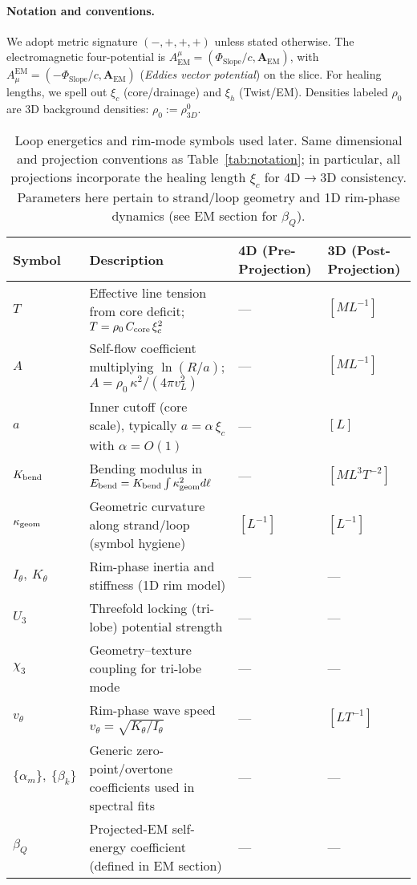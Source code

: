 \paragraph{Notation and conventions.}
We adopt metric signature $(-,+,+,+)$ unless stated otherwise. The electromagnetic four-potential is $A^\mu_{\text{EM}}=(\Phi_{\text{Slope}}/c,\mathbf A_{\text{EM}})$, with $A_{\mu}^{\text{EM}} = (-\Phi_{\text{Slope}}/c,\mathbf A_{\text{EM}})$ (\emph{Eddies vector potential}) on the slice. For healing lengths, we spell out $\xi_c$ (core/drainage) and $\xi_h$ (Twist/EM). Densities labeled $\rho_0$ are 3D background densities: $\rho_0 := \rho_{3D}^0$.

\begin{table}[H]
\centering
\begingroup
\small
\begin{tabularx}{\textwidth}{|l|Y|l|l|}
\hline
Symbol & Description & 4D (Pre-Projection) & 3D (Post-Projection) \\
\hline
$T$ & Effective line tension from core deficit; $T=\rho_0\,C_{\rm core}\,\xi_c^2$ & --- & $[M L^{-1}]$ \\
\hline
$A$ & Self-flow coefficient multiplying $\ln(R/a)$; $A=\rho_0\,\kappa^2/(4\pi v_L^2)$ & --- & $[M L^{-1}]$ \\
\hline
$a$ & Inner cutoff (core scale), typically $a=\alpha\,\xi_c$ with $\alpha=O(1)$ & --- & $[L]$ \\
\hline
$K_{\rm bend}$ & Bending modulus in $E_{\rm bend}=K_{\rm bend}\int \kappa_{\rm geom}^2 d\ell$ & --- & $[M L^{3} T^{-2}]$ \\
\hline
$\kappa_{\rm geom}$ & Geometric curvature along strand/loop (symbol hygiene) & $[L^{-1}]$ & $[L^{-1}]$ \\
\hline
$I_\theta,\ K_\theta$ & Rim-phase inertia and stiffness (1D rim model) & --- & --- \\
\hline
$U_3$ & Threefold locking (tri-lobe) potential strength & --- & --- \\
\hline
$\chi_3$ & Geometry–texture coupling for tri-lobe mode & --- & --- \\
\hline
$v_\theta$ & Rim-phase wave speed $v_\theta=\sqrt{K_\theta/I_\theta}$ & --- & $[L T^{-1}]$ \\
\hline
$\{\alpha_m\},\ \{\beta_k\}$ & Generic zero-point/overtone coefficients used in spectral fits & --- & --- \\
\hline
$\beta_Q$ & Projected-EM self-energy coefficient (defined in EM section) & --- & --- \\
\hline
\end{tabularx}
\endgroup
\caption{Loop energetics and rim-mode symbols used later. Same dimensional and projection conventions as Table~\ref{tab:notation}; in particular, all projections incorporate the healing length $\xi_c$ for 4D$\to$3D consistency. Parameters here pertain to strand/loop geometry and 1D rim-phase dynamics (see EM section for $\beta_Q$).}
\label{tab:notation-loop}
\end{table}

